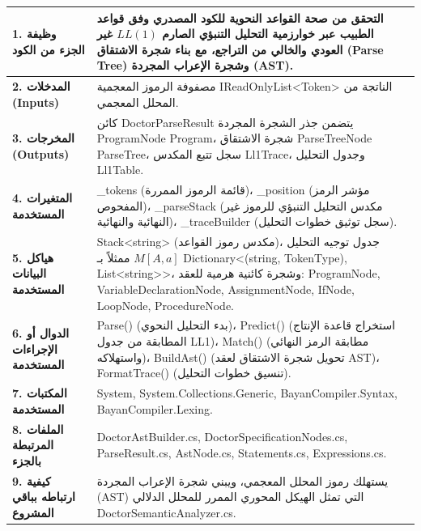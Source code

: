 \documentclass[12pt,a4paper]{report}
\begin{document}
\begin{tcolorbox}[colback=white,colframe=vscodeBlue!80!black,arc=2mm,title=\textbf{بطاقة المواصفات البرمجية للمحلل النحوي (Predictive LL(1) Parser Specification)}]
\begin{tabularx}{\linewidth}{p{4.2cm} X}
    \textbf{1. وظيفة الجزء من الكود} & التحقق من صحة القواعد النحوية للكود المصدري وفق قواعد الطبيب عبر خوارزمية التحليل التنبؤي الصارم $LL(1)$ غير العودي والخالي من التراجع، مع بناء شجرة الاشتقاق (Parse Tree) وشجرة الإعراب المجردة (AST). \\
    \midrule
    \textbf{2. المدخلات (Inputs)} & مصفوفة الرموز المعجمية \textenglish{IReadOnlyList\textless Token\textgreater} الناتجة من المحلل المعجمي. \\
    \midrule
    \textbf{3. المخرجات (Outputs)} & كائن \textenglish{DoctorParseResult} يتضمن جذر الشجرة المجردة \textenglish{ProgramNode Program}، شجرة الاشتقاق \textenglish{ParseTreeNode ParseTree}، سجل تتبع المكدس \textenglish{Ll1Trace}، وجدول التحليل \textenglish{Ll1Table}. \\
    \midrule
    \textbf{4. المتغيرات المستخدمة} & \textenglish{\_tokens} (قائمة الرموز الممررة)، \textenglish{\_position} (مؤشر الرمز المفحوص)، \textenglish{\_parseStack} (مكدس التحليل التنبؤي للرموز غير النهائية والنهائية)، \textenglish{\_traceBuilder} (سجل توثيق خطوات التحليل). \\
    \midrule
    \textbf{5. هياكل البيانات المستخدمة} & \textenglish{Stack\textless string\textgreater} (مكدس رموز القواعد)، جدول توجيه التحليل $M[A, a]$ ممثلاً بـ \textenglish{Dictionary\textless(string, TokenType), List\textless string\textgreater\textgreater}، وشجرة كائنية هرمية للعقد: \textenglish{ProgramNode, VariableDeclarationNode, AssignmentNode, IfNode, LoopNode, ProcedureNode}. \\
    \midrule
    \textbf{6. الدوال أو الإجراءات المستخدمة} & \textenglish{Parse()} (بدء التحليل النحوي)، \textenglish{Predict()} (استخراج قاعدة الإنتاج المطابقة من جدول LL1)، \textenglish{Match()} (مطابقة الرمز النهائي واستهلاكه)، \textenglish{BuildAst()} (تحويل شجرة الاشتقاق لعقد AST)، \textenglish{FormatTrace()} (تنسيق خطوات التحليل). \\
    \midrule
    \textbf{7. المكتبات المستخدمة} & \textenglish{System, System.Collections.Generic, BayanCompiler.Syntax, BayanCompiler.Lexing}. \\
    \midrule
    \textbf{8. الملفات المرتبطة بالجزء} & \textenglish{DoctorAstBuilder.cs, DoctorSpecificationNodes.cs, ParseResult.cs, AstNode.cs, Statements.cs, Expressions.cs}. \\
    \midrule
    \textbf{9. كيفية ارتباطه بباقي المشروع} & يستهلك رموز المحلل المعجمي، ويبني شجرة الإعراب المجردة (AST) التي تمثل الهيكل المحوري الممرر للمحلل الدلالي \textenglish{DoctorSemanticAnalyzer.cs}. \\
\end{tabularx}
\end{tcolorbox}
\end{document}
